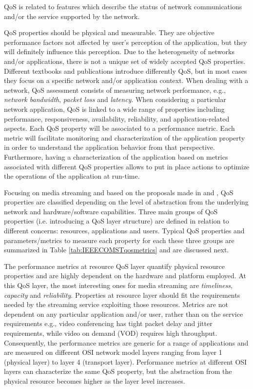 QoS is related to features which describe the status of network communications and/or the service supported by the network.

QoS properties should be physical and measurable. They are objective performance factors not affected by user's perception of the application, but they will definitely influence this perception. Due to the heterogeneity of networks and/or applications, there is not a unique set of widely accepted QoS properties. Different textbooks and publications introduce differently QoS, but in most cases they focus on a specific network and/or application context. When dealing with a network, QoS assessment consists of measuring network performance, e.g., \textit{network bandwidth}, \textit{packet loss} and \textit{latency}. When considering a particular network application, QoS is linked to a wide range of properties %
including performance, responsiveness, availability, reliability, and application-related aspects. Each QoS property will be associated to a performance metric. Each metric will facilitate monitoring and characterization of the application property in order to understand the application behavior from that perspective. Furthermore, having a characterization of the application based on metrics associated with different QoS properties allows to put in place actions to optimize the operations of the application at run-time.

Focusing on media streaming and based on the proposals made in \cite{Jin2004} and \cite{Akhtar2017}, QoS properties are classified depending on the level of abstraction from the underlying network and hardware/software capabilities. Three main groups of QoS properties (i.e. introducing a QoS layer structure) are defined in relation to different concerns: resources, applications and users. Typical QoS properties and parameters/metrics to measure each property for each these three groups are summarized in Table \ref{tab:IEEECOMSTqosmetrics} and are discussed next.

The performance metrics at resource QoS layer quantify physical resource properties and are highly dependent on the hardware and platform employed. At this QoS layer, the most interesting ones for media streaming are \textit{timeliness}, \textit{capacity} and \textit{reliability}. Properties at resource layer should fit the requirements needed by the streaming service exploiting those resources. Metrics are %
not dependent on any particular application and/or user, %
rather than on the service requirements e.g., video conferencing has tight packet delay and jitter requirements, while video on demand (VOD) requires high throughput. Consequently, the performance metrics are generic for a range of applications and are measured on different OSI network model layers ranging from layer 1 (physical layer) to layer 4 (transport layer). Performance metrics at different OSI layers can characterize the same QoS property, but the abstraction from the physical resource becomes higher as the layer level increases.

